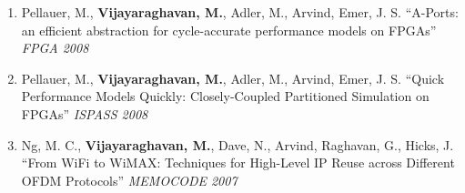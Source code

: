\documentclass[margin,line]{resume}
\begin{document}
\begin{resume}
\begin{enumerate}
    \item Pellauer, M.,
    \textbf{Vijayaraghavan, M.}, Adler, M., Arvind, Emer, J. S. ``A-Ports: an
    efficient abstraction for cycle-accurate performance models on FPGAs''
    \textit{FPGA 2008}
    \item Pellauer, M., \textbf{Vijayaraghavan, M.}, Adler, M., Arvind, Emer,
    J. S. ``Quick Performance Models Quickly: Closely-Coupled Partitioned
    Simulation on FPGAs'' \textit{ISPASS 2008}
    \item Ng, M. C., \textbf{Vijayaraghavan, M.}, Dave, N., Arvind, Raghavan, G., Hicks, J. ``From WiFi to WiMAX: Techniques for High-Level IP Reuse across Different OFDM Protocols'' \textit{MEMOCODE 2007}
    \end{enumerate}





\end{resume}
\end{document}
